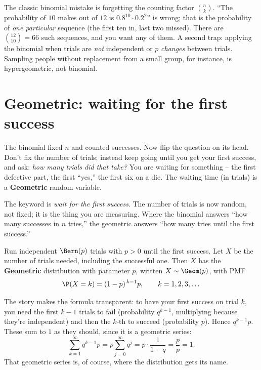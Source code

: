 \begin{trapbox}
The classic binomial mistake is forgetting the counting factor $\binom{n}{k}$.
``The probability of $10$ makes out of $12$ is $0.8^{10} \cdot 0.2^2$'' is wrong;
that is the probability of \emph{one particular} sequence (the first ten in, last
two missed). There are $\binom{12}{10} = 66$ such sequences, and you want any of
them. A second trap: applying the binomial when trials are \emph{not}
independent or $p$ \emph{changes} between trials. Sampling people without
replacement from a small group, for instance, is hypergeometric, not binomial.
\end{trapbox}

\section{Geometric: waiting for the first success}
\label{ch07:geometric}

The binomial fixed $n$ and counted successes. Now flip the question on its head.
Don't fix the number of trials; instead keep going until you get your first
success, and ask: \emph{how many trials did that take?} You are waiting for
something -- the first defective part, the first ``yes,'' the first six on a die.
The waiting time (in trials) is a \textbf{Geometric} random variable.

\begin{intuitionbox}
The keyword is \emph{wait for the first success}. The number of trials is now
random, not fixed; it is the thing you are measuring. Where the binomial answers
``how many successes in $n$ tries,'' the geometric answers ``how many tries until
the first success.''
\end{intuitionbox}

\begin{definition}
\label{ch07:def-geometric}
Run independent $\Bern(p)$ trials with $p > 0$ until the first success. Let $X$ be
the number of trials needed, including the successful one. Then $X$ has the
\textbf{Geometric} distribution with parameter $p$, written $X \sim \Geom(p)$,
with PMF
\[
  \P(X = k) = (1-p)^{\,k-1} p, \qquad k = 1, 2, 3, \dots
\]
\end{definition}

The story makes the formula transparent: to have your first success on trial $k$,
you need the first $k-1$ trials to fail (probability $q^{k-1}$, multiplying
because they're independent) and then the $k$-th to succeed (probability $p$).
Hence $q^{k-1} p$. These sum to $1$ as they should, since it is a geometric series:
\[
  \sum_{k=1}^{\infty} q^{k-1} p = p \sum_{j=0}^{\infty} q^{j}
  = p \cdot \frac{1}{1-q} = \frac{p}{p} = 1.
\]
That geometric series is, of course, where the distribution gets its name.

